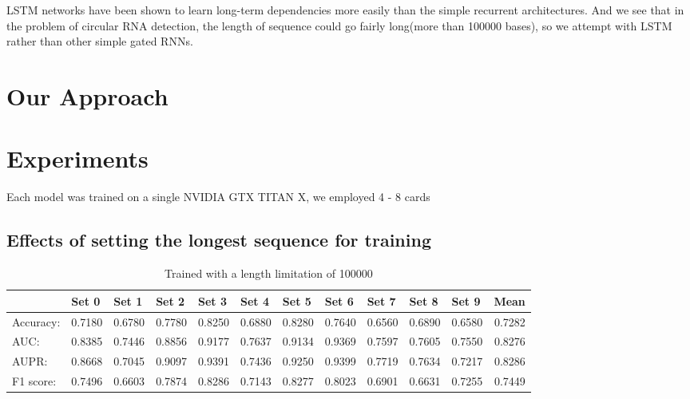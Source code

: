 \documentclass[10pt,a4paper]{article}
\begin{document}
\begin{spacing}{1.5}
LSTM networks have been shown to learn long-term dependencies more easily than the simple recurrent architectures. And we see that in the problem of circular RNA detection, the length of sequence could go fairly long(more than 100000 bases), so we attempt with LSTM rather than other simple gated RNNs.

\section{Our Approach}

\section{Experiments}

Each model was trained on a single NVIDIA GTX TITAN X, we employed 4 - 8 cards

\subsection{Effects of setting the longest sequence for training}

\begin{table}[H]
	\centering
	\caption{Trained with a length limitation of 100000}
	\begin{tabular}{l|rrrrrrrrrr|r}
		& \multicolumn{1}{l}{Set 0} & \multicolumn{1}{l}{Set 1} & \multicolumn{1}{l}{Set 2} & \multicolumn{1}{l}{Set 3} & \multicolumn{1}{l}{Set 4} & \multicolumn{1}{l}{Set 5} & \multicolumn{1}{l}{Set 6} & \multicolumn{1}{l}{Set 7} & \multicolumn{1}{l}{Set 8} & \multicolumn{1}{l}{Set 9} & \multicolumn{1}{l}{Mean} \\ \hline \hline
		Accuracy: & 0.7180  & 0.6780  & 0.7780  & 0.8250  & 0.6880  & 0.8280  & 0.7640  & 0.6560  & 0.6890  & 0.6580  & 0.7282  \\
		AUC:  & 0.8385  & 0.7446  & 0.8856  & 0.9177  & 0.7637  & 0.9134  & 0.9369  & 0.7597  & 0.7605  & 0.7550  & 0.8276  \\
		AUPR: & 0.8668  & 0.7045  & 0.9097  & 0.9391  & 0.7436  & 0.9250  & 0.9399  & 0.7719  & 0.7634  & 0.7217  & 0.8286  \\
		F1 score: & 0.7496  & 0.6603  & 0.7874  & 0.8286  & 0.7143  & 0.8277  & 0.8023  & 0.6901  & 0.6631  & 0.7255  & 0.7449  \\
	\end{tabular}%
	\label{tab:addlabel}%
\end{table}%


\end{spacing}
\end{document}
